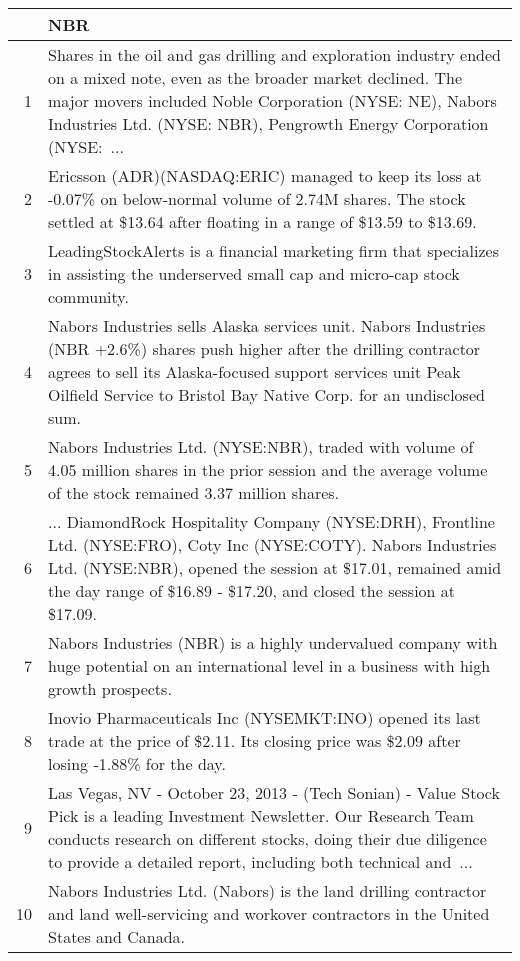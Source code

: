 \documentclass{tufte-handout}\usepackage[]{graphicx}\usepackage[]{color}
\begin{document}
\begin{tabularx}{\textwidth}{rX}
  \hline
 & NBR \\ 
  \hline
1 &  Shares in the oil and gas drilling and exploration industry ended on a mixed note, even as the broader market declined. The major movers included Noble Corporation (NYSE: NE), Nabors Industries Ltd. (NYSE: NBR), Pengrowth Energy Corporation (NYSE: ...  \\ 
  2 &  Ericsson (ADR)(NASDAQ:ERIC) managed to keep its loss at -0.07\% on below-normal volume of 2.74M shares. The stock settled at \$13.64 after floating in a range of \$13.59 to \$13.69.  \\ 
  3 &  LeadingStockAlerts is a financial marketing firm that specializes in assisting the underserved small cap and micro-cap stock community.  \\ 
  4 &  Nabors Industries sells Alaska services unit. Nabors Industries (NBR +2.6\%) shares push higher after the drilling contractor agrees to sell its Alaska-focused support services unit Peak Oilfield Service to Bristol Bay Native Corp. for an undisclosed sum.  \\ 
  5 &  Nabors Industries Ltd. (NYSE:NBR), traded with volume of 4.05 million shares in the prior session and the average volume of the stock remained 3.37 million shares.  \\ 
  6 &  ... DiamondRock Hospitality Company (NYSE:DRH), Frontline Ltd. (NYSE:FRO), Coty Inc (NYSE:COTY). Nabors Industries Ltd. (NYSE:NBR), opened the session at \$17.01, remained amid the day range of \$16.89 - \$17.20, and closed the session at \$17.09.  \\ 
  7 &  Nabors Industries (NBR) is a highly undervalued company with huge potential on an international level in a business with high growth prospects.  \\ 
  8 &  Inovio Pharmaceuticals Inc (NYSEMKT:INO) opened its last trade at the price of \$2.11. Its closing price was \$2.09 after losing -1.88\% for the day.  \\ 
  9 &  Las Vegas, NV - October 23, 2013 - (Tech Sonian) - Value Stock Pick is a leading Investment Newsletter. Our Research Team conducts research on different stocks, doing their due diligence to provide a detailed report, including both technical and ...  \\ 
  10 &  Nabors Industries Ltd. (Nabors) is the land drilling contractor and land well-servicing and workover contractors in the United States and Canada.  \\ 
   \hline
\end{tabularx}
\end{document}
